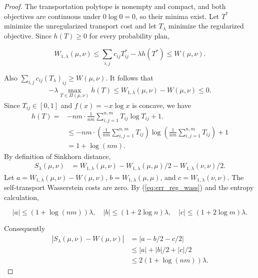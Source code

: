 \begin{proof}
The transportation polytope is nonempty and compact, and both objectives are continuous under $0\log0=0$, so their minima exist. Let $T^*$ minimize the unregularized transport cost and let $T_\lambda$ minimize the regularized objective. Since $h(T)\geqslant0$ for every probability plan,

\[
W_{1,\lambda}(\mu,\nu)\leqslant\sum_{i,j}c_{ij}T^*_{ij}-\lambda h(T^*)\leqslant W(\mu,\nu).
\]

Also $\sum_{i,j}c_{ij}(T_\lambda)_{ij}\geqslant W(\mu,\nu)$. It follows that
\begin{align}\label{eq:err_reg_wass}
-\lambda\max_{T\in\Pi(\mu,\nu)}h(T)\leqslant W_{1,\lambda}(\mu,\nu)-W(\mu,\nu)\leqslant0.
\end{align} Since $ T_{ij} \in [ 0,1]$ and $ f( x) =-x\log x$ is concave, we have 
\begin{align*}
h( T) = & -nm\cdot \frac{1}{nm}\sum _{i,j=1}^{n,m} T_{ij}\log T_{ij} +1.\\
 & \leqslant -nm\cdot \left(\frac{1}{nm}\sum _{i,j=1}^{n,m} T_{ij}\right)\log\left(\frac{1}{nm}\sum _{i,j=1}^{n,m} T_{ij}\right) +1\\
 & =1+\log( nm) .
\end{align*}
By definition of Sinkhorn distance, 
\begin{align*}
S_{\lambda }( \mu ,\nu ) & = W_{1,\lambda }( \mu ,\nu ) -W_{1,\lambda }( \mu ,\mu )/2 -W_{1,\lambda }( \nu ,\nu )/2 .
\end{align*}
Let $a=W_{1,\lambda}(\mu,\nu)-W(\mu,\nu)$, $b=W_{1,\lambda}(\mu,\mu)$, and $c=W_{1,\lambda}(\nu,\nu)$. The self-transport Wasserstein costs are zero. By (\ref{eq:err_reg_wass}) and the entropy calculation,

\[
|a|\leqslant(1+\log(nm))\lambda,\quad |b|\leqslant(1+2\log n)\lambda,\quad |c|\leqslant(1+2\log m)\lambda.
\]

Consequently
\begin{align*}
|S_\lambda(\mu,\nu)-W(\mu,\nu)|
&=|a-b/2-c/2|\\
&\leqslant|a|+|b|/2+|c|/2\\
&\leqslant2(1+\log(nm))\lambda.
\end{align*}
\end{proof}

